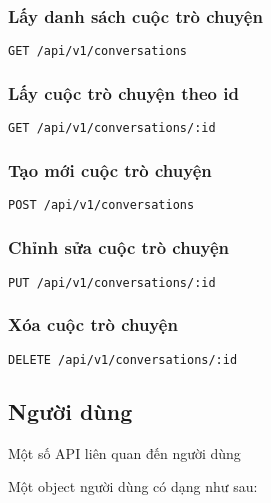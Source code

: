 \documentclass[../Thesis.tex]{subfiles}
\begin{document}
          \subsubsection{Lấy danh sách cuộc trò chuyện}
          \begin{lstlisting}[language=bash]
            GET /api/v1/conversations
          \end{lstlisting}

          \subsubsection{Lấy cuộc trò chuyện theo id}
          \begin{lstlisting}[language=bash]
            GET /api/v1/conversations/:id
          \end{lstlisting}

          \subsubsection{Tạo mới cuộc trò chuyện}
          \begin{lstlisting}[language=bash]
            POST /api/v1/conversations
          \end{lstlisting}

          \subsubsection{Chỉnh sửa cuộc trò chuyện}
          \begin{lstlisting}[language=bash]
            PUT /api/v1/conversations/:id
          \end{lstlisting}

          \subsubsection{Xóa cuộc trò chuyện}
          \begin{lstlisting}[language=bash]
            DELETE /api/v1/conversations/:id
          \end{lstlisting}

      \subsection{Người dùng}

          Một số API liên quan đến người dùng

          Một object người dùng có dạng như sau:
\end{document}

